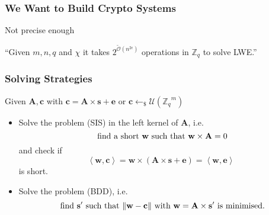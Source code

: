\documentclass[10pt]{beamer}
\newcommand{\U}[1]{\ensuremath{\mathcal{U}(#1)\xspace}}
\newcommand{\abs}[1]{\ensuremath{\|#1\|}\xspace}
\newcommand{\dotp}[2]{\ensuremath{\left\langle {#1},{#2}\right\rangle}\xspace}
\renewcommand{\vec}[1]{\mathbf{#1}\xspace}
\newcommand{\cemph}[1]{{\color{yellow9}{\bf #1}}\xspace}
\newcommand{\Z}{\ensuremath{\mathbb{Z}}\xspace}
\newcommand{\Zq}{\ensuremath{\Z_q}\xspace}
\newcommand{\Ldis}{L_{\mathbf{s},\chi}^{(n)}\xspace}
\newcommand{\sample}{\ensuremath{\leftarrow_{\$}}}
\begin{document}
\begin{frame}
% 
% 

\end{frame}


\begin{frame}
\frametitle{We Want to Build Crypto Systems}

\begin{block}{Not precise enough}
\begin{center}
``Given $m, n, q$ and $\chi$ it takes
{\large $2^{\tilde{\mathcal{O}}(n^{2\epsilon})}$}
operations in $\Zq$ to solve LWE.''
\end{center}
\end{block}


\end{frame}


\begin{frame}
\frametitle{Solving Strategies}

Given $\vec{A},\vec{c}$ with $\vec{c} = \vec{A} \times \vec{s} + \vec{e}$ or $\vec{c} \sample \U{\Zq^m}$

\vspace{1em}

\begin{itemize}

\item Solve the \cemph{Short Integer Solutions} problem (SIS) in the left kernel of $\vec{A}$, i.e.
\[
 \textnormal{ find a short } \vec{w} \textnormal{ such that } \vec{w} \times \vec{A} = 0
\]
 and check if $$\dotp{\vec{w}}{\vec{c}} = \vec{w}\times \left(\vec{A} \times \vec{s} + \vec{e}\right) = \dotp{\vec{w}}{\vec{e}}$$ is short.
\pause

\item Solve the \cemph{Bounded Distance Decoding} problem (BDD), i.e.\ 
\[
 \textnormal{ find } \vec{s'} \textnormal{ such that } \abs{\vec{w} - \vec{c}} \textnormal{ with } \vec{w} = \vec{A} \times \vec{s'} \textnormal{ is minimised} .
\]


\end{itemize}
\end{frame}
\end{document}
